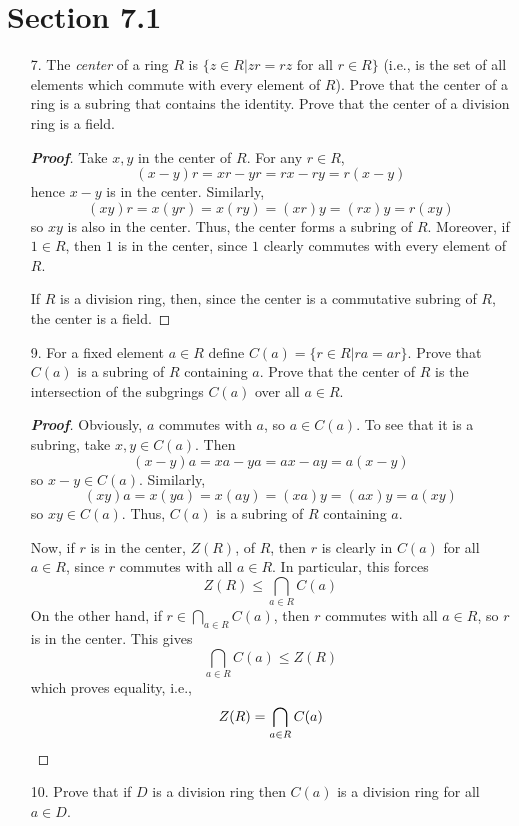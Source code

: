 \documentclass[12pt,leqno]{book}
\theoremstyle{definition}
\newenvironment{Proof}{\begin{proof}[\textnormal{\textbf{Proof}}]}{\end{proof}}
\begin{document}
\section*{Section 7.1}
\begin{enumerate}
 \item [7.] The \textit{center} of a ring $R$ is $\{z\in R|zr=rz\text{ for all }r\in R\}$ (i.e., is the set of all elements which commute with every element of $R$). Prove that the center of a ring is a subring that contains the identity. Prove that the center of a division ring is a field.

\begin{Proof}
 Take $x,y$ in the center of $R$. For any $r\in R$, \[(x-y)r=xr-yr=rx-ry=r(x-y)\] hence $x-y$ is in the center. Similarly, \[(xy)r=x(yr)=x(ry)=(xr)y=(rx)y=r(xy)\] so $xy$ is also in the center. Thus, the center forms a subring of $R$. Moreover, if $1\in R$, then $1$ is in the center, since $1$ clearly commutes with every element of $R$. 

 If $R$ is a division ring, then, since the center is a commutative subring of $R$, the center is a field.
\end{Proof}

 \item [9.] For a fixed element $a\in R$ define $C(a)=\{r\in R|ra=ar\}$. Prove that $C(a)$ is a subring of $R$ containing $a$. Prove that the center of $R$ is the intersection of the subgrings $C(a)$ over all $a\in R$.

\begin{Proof}
 Obviously, $a$ commutes with $a$, so $a\in C(a)$. To see that it is a subring, take $x,y\in C(a)$. Then \[(x-y)a=xa-ya=ax-ay=a(x-y)\] so $x-y\in C(a)$. Similarly, \[(xy)a=x(ya)=x(ay)=(xa)y=(ax)y=a(xy)\] so $xy\in C(a)$. Thus, $C(a)$ is a subring of $R$ containing $a$. 

Now, if $r$ is in the center, $Z(R)$, of $R$, then $r$ is clearly in $C(a)$ for all $a\in R$, since $r$ commutes with all $a\in R$. In particular, this forces \[Z(R)\leq\bigcap_{a\in R}C(a)\] On the other hand, if $\displaystyle r\in\bigcap_{a\in R}C(a)$, then $r$ commutes with all $a\in R$, so $r$ is in the center. This gives \[\bigcap_{a\in R}C(a)\leq Z(R)\] which proves equality, i.e., \[Z(R)=\bigcap_{a\in R}C(a)\qedhere\]
\end{Proof}

 \item [10.] Prove that if $D$ is a division ring then $C(a)$ is a division ring for all $a\in D$.


\end{enumerate}
\end{document}
